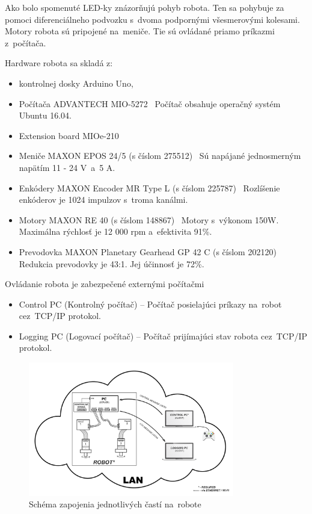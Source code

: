Ako bolo spomenuté LED-ky znázorňujú pohyb robota. Ten sa pohybuje za pomoci diferenciálneho podvozku s~dvoma podpornými všesmerovými kolesami.
Motory robota sú pripojené na~meniče. Tie sú ovládané priamo príkazmi z~počítača.

Hardware robota sa skladá z:
\begin{itemize}
	\item kontrolnej dosky Arduino Uno,

	\item Počítača ADVANTECH MIO-5272~\cite{robotPc} \newline
		Počítač obsahuje operačný systém Ubuntu 16.04.

	\item Extension board MIOe-210~\cite{extensionModule}

	\item Meniče MAXON EPOS 24/5 (s číslom 275512)~\cite{menic} \newline
	 	Sú napájané jednosmerným napätím 11 - 24 V~a~5 A.

	\item Enkódery MAXON Encoder MR Type L (s číslom 225787)~\cite{encoder} \newline
		Rozlíšenie enkóderov je 1024 impulzov s~troma kanálmi.

	\item Motory MAXON RE 40 (s číslom 148867)~\cite{motor} \newline
		Motory s~výkonom 150W. Maximálna rýchlosť je 12 000 rpm a~efektivita 91\%.

	\item Prevodovka MAXON Planetary Gearhead GP 42 C (s číslom 202120)~\cite{prevodovka} \newline
		Redukcia prevodovky je 43:1. Jej účinnosť je 72\%.
\end{itemize}

\noindent Ovládanie robota je zabezpečené externými počítačmi
\begin{itemize}
	\item Control PC (Kontrolný počítač) -- Počítač posielajúci príkazy na~robot cez~TCP/IP protokol.
	\item Logging PC (Logovací počítač) -- Počítač prijímajúci stav robota cez~TCP/IP protokol.
\end{itemize}

\begin{figure}[!htbp]
	\begin{center}
		\includegraphics[width=9cm]{img/schemaRobota.png}
	\end{center}
	\caption{Schéma zapojenia jednotlivých častí na~robote}
	\label{fig:schemaRobota}
\end{figure}

